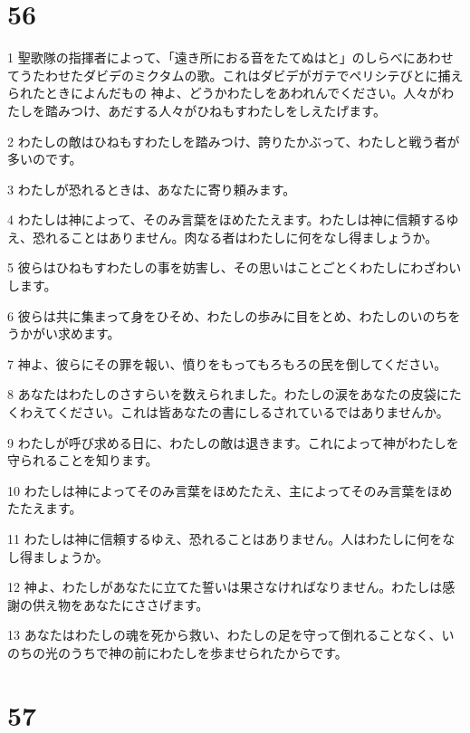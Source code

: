 \chapter{56}

\par 1 聖歌隊の指揮者によって、「遠き所におる音をたてぬはと」のしらべにあわせてうたわせたダビデのミクタムの歌。これはダビデがガテでペリシテびとに捕えられたときによんだもの 神よ、どうかわたしをあわれんでください。人々がわたしを踏みつけ、あだする人々がひねもすわたしをしえたげます。
\par 2 わたしの敵はひねもすわたしを踏みつけ、誇りたかぶって、わたしと戦う者が多いのです。
\par 3 わたしが恐れるときは、あなたに寄り頼みます。
\par 4 わたしは神によって、そのみ言葉をほめたたえます。わたしは神に信頼するゆえ、恐れることはありません。肉なる者はわたしに何をなし得ましょうか。
\par 5 彼らはひねもすわたしの事を妨害し、その思いはことごとくわたしにわざわいします。
\par 6 彼らは共に集まって身をひそめ、わたしの歩みに目をとめ、わたしのいのちをうかがい求めます。
\par 7 神よ、彼らにその罪を報い、憤りをもってもろもろの民を倒してください。
\par 8 あなたはわたしのさすらいを数えられました。わたしの涙をあなたの皮袋にたくわえてください。これは皆あなたの書にしるされているではありませんか。
\par 9 わたしが呼び求める日に、わたしの敵は退きます。これによって神がわたしを守られることを知ります。
\par 10 わたしは神によってそのみ言葉をほめたたえ、主によってそのみ言葉をほめたたえます。
\par 11 わたしは神に信頼するゆえ、恐れることはありません。人はわたしに何をなし得ましょうか。
\par 12 神よ、わたしがあなたに立てた誓いは果さなければなりません。わたしは感謝の供え物をあなたにささげます。
\par 13 あなたはわたしの魂を死から救い、わたしの足を守って倒れることなく、いのちの光のうちで神の前にわたしを歩ませられたからです。

\chapter{57}

